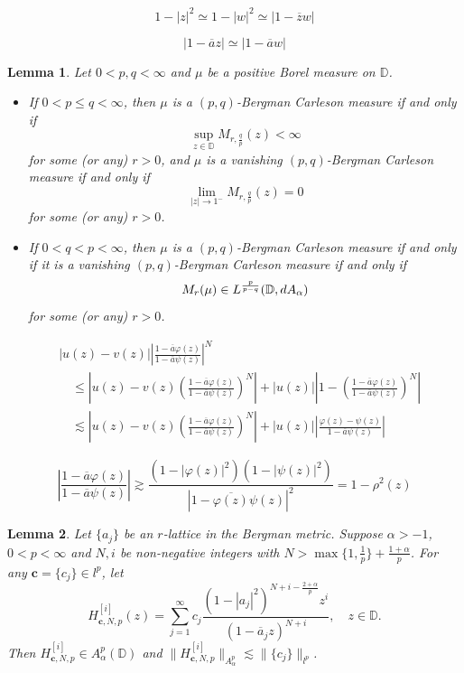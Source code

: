\documentclass[10pt,a4paper]{amsart}
\newtheorem{lemma}{Lemma}
\begin{document}
\begin{equation}\label{equa2.3}
1-|z|^2\simeq 1-|w|^2\simeq |1-\overline{z}w|
\end{equation}

\begin{equation}\label{equa2.4}
|1-\overline{a}z|\simeq |1-\overline{a}w|
\end{equation}

\begin{lemma}\label{lemma2.7}
Let $0<p,q<\infty$ and $\mu$ be a positive Borel measure on $\mathbb{D}$.
\begin{itemize}
\item[(i)] If $0<p\leq q<\infty$, then $\mu$ is a $(p,q)$-Bergman Carleson measure if and only if 
$$\sup_{z\in\mathbb{D}}M_{r,\frac{q}{p}}(z)<\infty$$
for some (or any) $r>0$, and $\mu$ is a vanishing $(p,q)$-Bergman Carleson measure if and only if
$$\lim_{|z|\to 1^-}M_{r,\frac{q}{p}}(z)=0$$
for some (or any) $r>0$.
\item[(ii)] If $0<q<p<\infty$, then $\mu$ is a $(p,q)$-Bergman Carleson measure if and only if it is a vanishing $(p,q)$-Bergman Carleson measure if and only if
$$M_r(\mu)\in L^{\frac{p}{p-q}}(\mathbb{D},{\rm d}A_{\alpha})$$
for some (or any) $r>0$.
\end{itemize}
\end{lemma}

\begin{equation}\label{equa3.4}
\begin{split}
&|u(z)-v(z)|\left|\frac{1-\overline{a}\varphi(z)}{1-\overline{a}\psi(z)}\right|^N\\
&\quad \leq \left|u(z)-v(z)\left(\frac{1-\overline{a}\varphi(z)}{1-\overline{a}\psi(z)}\right)^N\right|+|u(z)|\left|1-\left(\frac{1-\overline{a}\varphi(z)}{1-\overline{a}\psi(z)}\right)^N\right|\\
&\quad \lesssim \left|u(z)-v(z)\left(\frac{1-\overline{a}\varphi(z)}{1-\overline{a}\psi(z)}\right)^N\right|+|u(z)|\left|\frac{\varphi(z)-\psi(z)}{1-\overline{a}\psi(z)}\right|
\end{split}
\end{equation}

\begin{equation}\label{equa3.5}
\left|\frac{1-\overline{a}\varphi(z)}{1-\overline{a}\psi(z)}\right|\gtrsim \frac{(1-|\varphi(z)|^2)(1-|\psi(z)|^2)}{|1-\overline{\varphi(z)}\psi(z)|^2}=1-\rho^2(z)
\end{equation}

\begin{lemma}\label{lemma2.3}
Let $\{a_j\}$ be an $r$-lattice in the Bergman metric. Suppose $\alpha>-1$, $0<p<\infty$ and $N,i$ be non-negative integers with $N>\max\{1,\frac{1}{p}\}+\frac{1+\alpha}{p}$. For any $\mathbf{c}=\{c_j\}\in l^p$, let
\begin{equation*}
H_{\mathbf{c}, N,p}^{[i]}(z)=\sum_{j=1}^{\infty}c_j\frac{(1-|a_j|^2)^{N+i-\frac{2+\alpha}{p}}z^i}{(1-\overline{a}_jz)^{N+i}},\quad z\in\mathbb{D}.
\end{equation*}
Then $H_{\mathbf{c},N,p}^{[i]}\in A_{\alpha}^p(\mathbb{D})$ and $\|H_{\mathbf{c}, N,p}^{[i]}\|_{A_{\alpha}^p}\lesssim \|\{c_j\}\|_{l^p}$.
\end{lemma}
\end{document}
